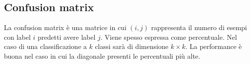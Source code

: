 	\subsection{Confusion matrix}
	La confusion matrix \`e una matrice in cui $(i, j)$ rappresenta il numero di esempi con label $i$ predetti avere label $j$.
	Viene spesso espressa come percentuale.
	Nel caso di una classificazione a $k$ classi sar\`a di dimensione $k\times k$.
	La performance \`e buona nel caso in cui la diagonale presenti le percentuali pi\`u alte.
